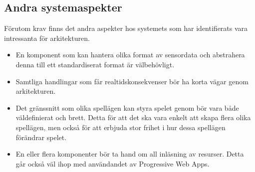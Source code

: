 \subsection{Andra systemaspekter}
Förutom krav finns det andra aspekter hos systemets som har identifierats vara intressanta för arkitekturen.

\begin{itemize}
    \item En komponent som kan hantera olika format av sensordata och abstrahera denna till ett standardiserat format är välbehövligt.
    \item Samtliga handlingar som får realtidskonsekvenser bör ha korta vägar genom arkitekturen.
    \item Det gränssnitt som olika spellägen kan styra spelet genom bör vara både väldefinierat och brett. Detta för att det ska vara enkelt att skapa flera olika spellägen, men också för att erbjuda stor frihet i hur dessa spellägen förändrar spelet.
    \item En eller flera komponenter bör ta hand om all inläsning av resurser. Detta går också väl ihop med användandet av Progressive Web Apps.
\end{itemize}
